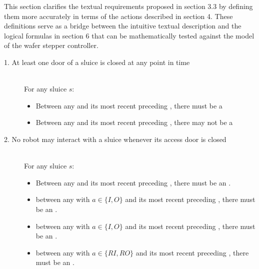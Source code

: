 
This section clarifies the textual requirements proposed in section 3.3 by defining them more accurately in terms of the actions described in section 4. These definitions serve as a bridge between the intuitive textual description and the logical formulas in section 6 that can be mathematically tested against the model of the wafer stepper controller.

\begin{description}
 \item[1. At least one door of a sluice is closed at any point in time] \hfill \\
 For any sluice $s$:
 \begin{itemize}
  \item Between any  and its most recent preceding , there must be a 
  \item Between any  and its most recent preceding , there may not be a 
 \end{itemize}

 \item[2. No robot may interact with a sluice whenever its access door is closed] \hfill \\
For any sluice $s$:

\begin{itemize}
	\item Between any  and its most recent preceding , there must be an .
	\item between any  with $a \in \{ I, O \}$ and its most recent preceding , there must be an .
	\item between any  with $a \in \{ I, O \}$ and its most recent preceding , there must be an .
	\item between any  with $a \in \{ RI, RO \}$ and its most recent preceding , there must be an .
\end{itemize}
 
 \item[] \hfill 
 

\end{description}
